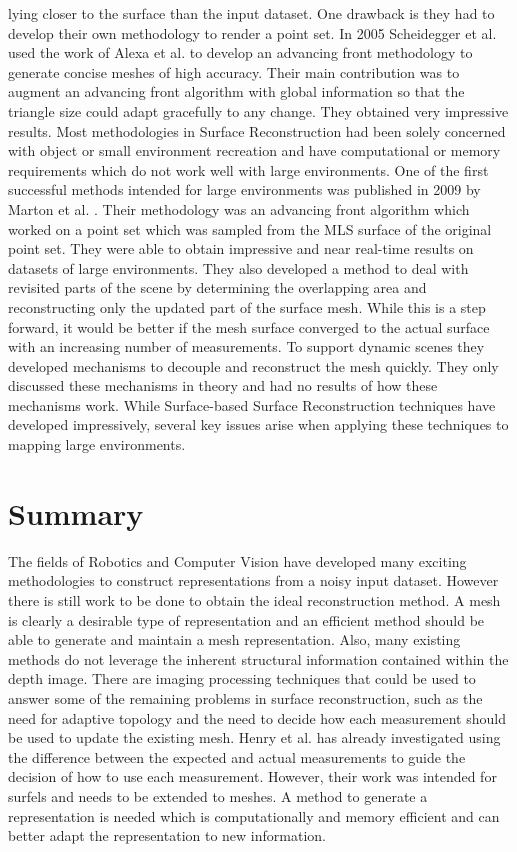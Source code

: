 lying closer to the surface than the input dataset. One drawback is they
had to develop their own methodology to render a point set. In 2005
Scheidegger et al. used the work of Alexa et al. to develop an advancing
front methodology to generate concise meshes of high accuracy. Their main
contribution was to augment an advancing front algorithm with global
information so that the triangle size could adapt gracefully to any change.
They obtained very impressive results. Most methodologies in Surface
Reconstruction had been solely concerned with object or small environment
recreation and have computational or memory requirements which do not work
well with large environments. One of the first successful methods intended
for large environments was published in 2009 by Marton et al.
\cite{Marton2009}. Their methodology was an advancing front algorithm which
worked on a point set which was sampled from the MLS surface of the
original point set. They were able to obtain impressive and near real-time
results on datasets of large environments. They also developed a method to
deal with revisited parts of the scene by determining the overlapping area
and reconstructing only the updated part of the surface mesh. While this is a
step forward, it would be better if the mesh surface converged
to the actual surface with an increasing number of measurements. To support
dynamic scenes they developed mechanisms to decouple and reconstruct the
mesh quickly. They only discussed these mechanisms in theory and had no
results of how these mechanisms work. While Surface-based Surface Reconstruction
techniques have developed impressively, several key issues arise
when applying these techniques to mapping large environments.

\section{Summary}

The fields of Robotics and Computer Vision have developed many exciting
methodologies to construct representations from a noisy input dataset.
However there is still work to be done to obtain the ideal reconstruction
method. A mesh is clearly a desirable type of representation and an
efficient method should be able to generate and maintain a mesh
representation. Also, many existing methods do not leverage the inherent
structural information contained within the depth image. There are imaging
processing techniques that could be used to answer some of the remaining
problems in surface reconstruction, such as the need for adaptive topology
and the need to decide how each measurement should be used to update the
existing mesh. Henry et al. \cite{Henry2012} has already investigated using
the difference between the expected and actual measurements to guide the
decision of how to use each measurement. However, their work was intended
for surfels and needs to be extended to meshes. A method to generate a
representation is needed which is computationally and memory efficient and
can better adapt the representation to new information.
